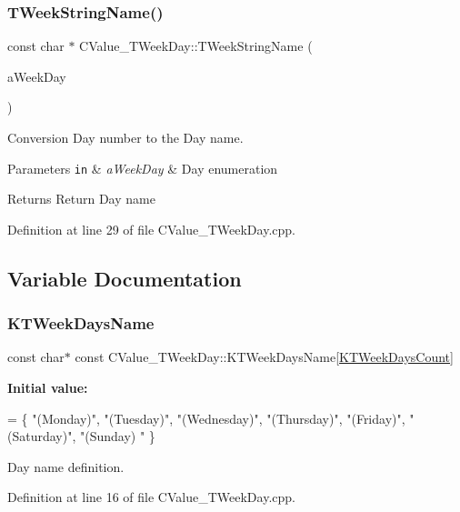 \subsubsection{\texorpdfstring{T\+Week\+String\+Name()}{TWeekStringName()}}
{\footnotesize\ttfamily const char $\ast$ C\+Value\+\_\+\+T\+Week\+Day\+::\+T\+Week\+String\+Name (\begin{DoxyParamCaption}\item[{\hyperlink{namespace_c_value___t_week_day_a6412f204509f223b789fb5f1a61a6124}{T\+Week\+Day}}]{a\+Week\+Day }\end{DoxyParamCaption})}



Conversion Day number to the Day name. 


\begin{DoxyParams}[1]{Parameters}
\mbox{\tt in}  & {\em a\+Week\+Day} & Day enumeration \\
\hline
\end{DoxyParams}
\begin{DoxyReturn}{Returns}
Return Day name 
\end{DoxyReturn}


Definition at line 29 of file C\+Value\+\_\+\+T\+Week\+Day.\+cpp.



\subsection{Variable Documentation}
\mbox{\label{namespace_c_value___t_week_day_a1c30aa5c20b662fe3dd12e7c26507d27}} 
\subsubsection{\texorpdfstring{K\+T\+Week\+Days\+Name}{KTWeekDaysName}}
{\footnotesize\ttfamily const char$\ast$ const C\+Value\+\_\+\+T\+Week\+Day\+::\+K\+T\+Week\+Days\+Name\mbox{[}\hyperlink{namespace_c_value___t_week_day_aafc13db7f1761bc02fc24499d9d30ef8aa662532b91895c243892c79eaafea534}{K\+T\+Week\+Days\+Count}\mbox{]}\hspace{0.3cm}{\ttfamily [static]}}

{\bfseries Initial value\+:}
\begin{DoxyCode}
=
                \{ \textcolor{stringliteral}{"(Monday)"}, \textcolor{stringliteral}{"(Tuesday)"}, \textcolor{stringliteral}{"(Wednesday)"}, \textcolor{stringliteral}{"(Thursday)"}, \textcolor{stringliteral}{"(Friday)"}, \textcolor{stringliteral}{"(Saturday)"}, \textcolor{stringliteral}{"(Sunday)
      "} \}
\end{DoxyCode}


Day name definition. 



Definition at line 16 of file C\+Value\+\_\+\+T\+Week\+Day.\+cpp.

